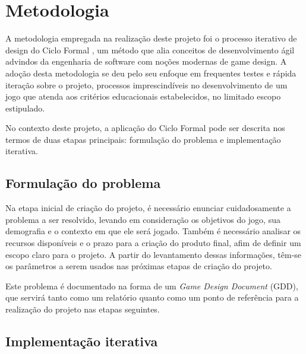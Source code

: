 
\chapter{Metodologia}\label{cap-metodologia}

A metodologia empregada na realização deste projeto foi o processo iterativo 
de design do Ciclo Formal \cite{schell:2010:art_game_design}, um método que 
alia conceitos de desenvolvimento ágil advindos da engenharia de software com 
noções modernas de game design. A adoção desta metodologia se deu pelo seu 
enfoque em frequentes testes e rápida iteração sobre o projeto, processos
imprescindíveis no desenvolvimento de um jogo que atenda aos critérios 
educacionais estabelecidos, no limitado escopo estipulado.

No contexto deste projeto, a aplicação do Ciclo Formal pode ser descrita nos 
termos de duas etapas principais: formulação do problema e implementação iterativa.

\section{Formulação do problema}\label{sec-met-formulacao-problema}

Na etapa inicial de criação do projeto, é necessário enunciar cuidadosamente 
a problema a ser resolvido, levando em consideração os objetivos do jogo, 
sua demografia e o contexto em que ele será jogado. Também é necessário analisar 
os recursos disponíveis e o prazo para a criação do produto final, afim de 
definir um escopo claro para o projeto. A partir do levantamento dessas 
informações, têm-se os parâmetros a serem usados nas próximas etapas de criação 
do projeto.

Este problema é documentado na forma de um \textit{Game Design Document} (GDD), 
que servirá tanto como um relatório quanto como um ponto de referência para 
a realização do projeto nas etapas seguintes.

\section{Implementação iterativa}\label{sec-met-implementacao-iterativa}

